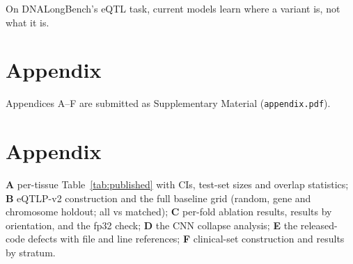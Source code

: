 On DNALongBench's eQTL task, current models learn where a variant is, not what it
is.




\ifdefined\RECOMB
\section*{Appendix}
\noindent Appendices A--F are submitted as Supplementary Material
(\texttt{appendix.pdf}).
\else
\appendix
\section*{Appendix}
\noindent
\textbf{A} per-tissue Table~\ref{tab:published} with CIs, test-set sizes and
overlap statistics; \textbf{B} eQTLP-v2 construction and the full baseline grid
(random, gene and chromosome holdout; all vs matched); \textbf{C} per-fold
ablation results, results by orientation, and the fp32 check; \textbf{D} the CNN
collapse analysis; \textbf{E} the released-code defects with file and line
references; \textbf{F} clinical-set construction and results by stratum.
\fi
